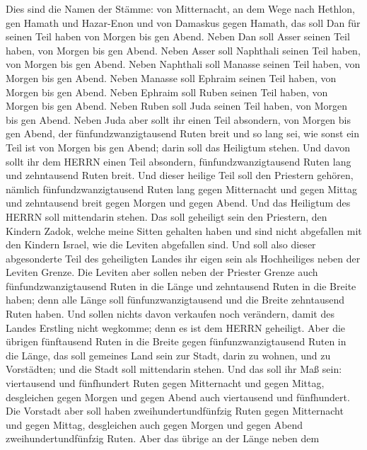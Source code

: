  Dies sind die Namen der Stämme: von Mitternacht, an dem
Wege nach Hethlon, gen Hamath und Hazar-Enon und von Damaskus gegen
Hamath, das soll Dan für seinen Teil haben von Morgen bis gen Abend.
 Neben Dan soll Asser seinen Teil haben, von Morgen bis gen
Abend.  Neben Asser soll Naphthali seinen Teil haben, von
Morgen bis gen Abend.  Neben Naphthali soll Manasse seinen
Teil haben, von Morgen bis gen Abend.  Neben Manasse soll
Ephraim seinen Teil haben, von Morgen bis gen Abend.  Neben
Ephraim soll Ruben seinen Teil haben, von Morgen bis gen Abend.
 Neben Ruben soll Juda seinen Teil haben, von Morgen bis gen
Abend.  Neben Juda aber sollt ihr einen Teil absondern, von
Morgen bis gen Abend, der fünfundzwanzigtausend Ruten breit und so lang
sei, wie sonst ein Teil ist von Morgen bis gen Abend; darin soll das
Heiligtum stehen.  Und davon sollt ihr dem HERRN einen Teil
absondern, fünfundzwanzigtausend Ruten lang und zehntausend Ruten breit.
 Und dieser heilige Teil soll den Priestern gehören,
nämlich fünfundzwanzigtausend Ruten lang gegen Mitternacht und gegen
Mittag und zehntausend breit gegen Morgen und gegen Abend. Und das
Heiligtum des HERRN soll mittendarin stehen.  Das soll
geheiligt sein den Priestern, den Kindern Zadok, welche meine Sitten
gehalten haben und sind nicht abgefallen mit den Kindern Israel, wie die
Leviten abgefallen sind.  Und soll also dieser abgesonderte
Teil des geheiligten Landes ihr eigen sein als Hochheiliges neben der
Leviten Grenze.  Die Leviten aber sollen neben der Priester
Grenze auch fünfundzwanzigtausend Ruten in die Länge und zehntausend
Ruten in die Breite haben; denn alle Länge soll fünfunzwanzigtausend und
die Breite zehntausend Ruten haben.  Und sollen nichts
davon verkaufen noch verändern, damit des Landes Erstling nicht
wegkomme; denn es ist dem HERRN geheiligt.  Aber die
übrigen fünftausend Ruten in die Breite gegen fünfunzwanzigtausend Ruten
in die Länge, das soll gemeines Land sein zur Stadt, darin zu wohnen,
und zu Vorstädten; und die Stadt soll mittendarin stehen. 
Und das soll ihr Maß sein: viertausend und fünfhundert Ruten gegen
Mitternacht und gegen Mittag, desgleichen gegen Morgen und gegen Abend
auch viertausend und fünfhundert.  Die Vorstadt aber soll
haben zweihundertundfünfzig Ruten gegen Mitternacht und gegen Mittag,
desgleichen auch gegen Morgen und gegen Abend zweihundertundfünfzig
Ruten.  Aber das übrige an der Länge neben dem
